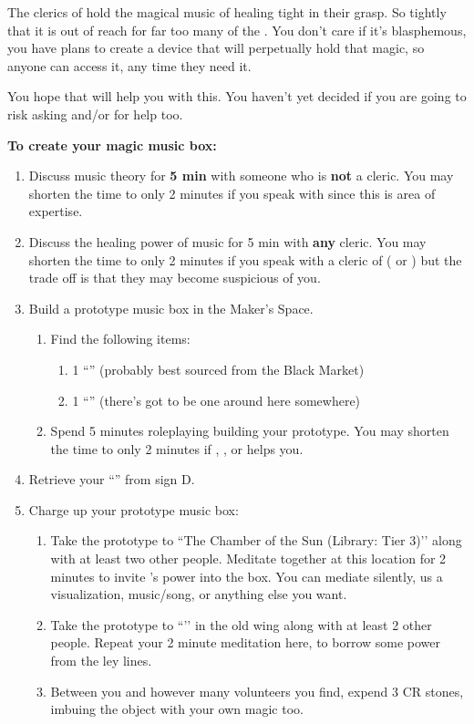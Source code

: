 \documentclass[green]{GL2020}
\begin{document}
\name{\gMusicBox{}}

The clerics of \cFarmGod{} hold the magical music of healing tight in their grasp. So tightly that it is out of reach for far too many of the \pFarmers{}. You don’t care if it’s blasphemous, you have plans to create a device that will perpetually hold that magic, so anyone can access it, any time they need it.

You hope that \cScholarship{\full} will help you with this. You haven’t yet decided if you are going to risk asking \cInterpol{\full} and/or \cMusic{\full} for help too.

\textbf{To create your magic music box:}
\begin{enumerate}
  \item Discuss music theory for \textbf{5 min} with someone who is \textbf{not} a cleric. You may shorten the time to only 2 minutes if you speak with \cMusic{\full} since this is \cMusic{\their} area of expertise.
  \item Discuss the healing power of music for 5 min with \textbf{any} cleric. You may shorten the time to only 2 minutes if you speak with a cleric of \cFarmGod{} (\cDisney{\full} or \cHedonist{\full}) but the trade off is that they may become suspicious of you.

  \item Build a prototype music box in the Maker’s Space.
  \begin{enumerate}
    \item Find the following items:
    \begin{enumerate}
      \item 1 ``\iMagitechParts{}'' (probably best sourced from the Black Market)
      \item 1 ``\iWoodenBlock{}'' (there’s got to be one around here somewhere)
    \end{enumerate}
    \item Spend 5 minutes roleplaying building your prototype. You may shorten the time to only 2 minutes if \cChupInventor{\full}, \cPirate{\full}, \cBunker{\full} or \cTechStar{\full} helps you.
  \end{enumerate}
  \item Retrieve your ``\iProtypeMusicBox{}'' from sign D.

  \item Charge up your prototype music box:
  \begin{enumerate}
	\item Take the prototype to ``The Chamber of the Sun (Library: Tier 3)’’ along with at least two other people. Meditate together at this location for 2 minutes to invite \cFarmGod{}’s power into the box. You can mediate silently, us a visualization, music/song, or anything else you want.
	\item Take the prototype to ``\sLeyLinesNexus{}’’ in the old wing along with at least 2 other people. Repeat your 2 minute meditation here, to borrow some power from the ley lines.
	\item Between you and however many volunteers you find, expend 3 CR stones, imbuing the object with your own magic too.
     \end{enumerate}


\end{enumerate}
\end{document}
